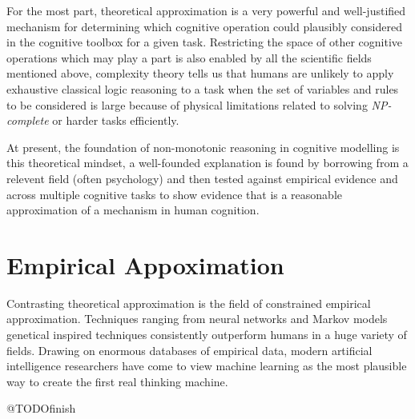 For the most part, theoretical approximation is a very powerful and well-justified mechanism for determining which cognitive operation could plausibly considered in the cognitive toolbox for a given task. Restricting the space of other cognitive operations which may play a part is also enabled by all the scientific fields mentioned above, complexity theory tells us that humans are unlikely to apply exhaustive classical logic reasoning to a task when the set of variables and rules to be considered is large because of physical limitations related to solving \textit{NP-complete} or harder tasks efficiently.

At present, the foundation of non-monotonic reasoning in cognitive modelling is this theoretical mindset, a well-founded explanation is found by borrowing from a relevent field (often psychology) and then tested against empirical evidence and across multiple cognitive tasks to show evidence that is a reasonable approximation of a mechanism in human cognition.


\section{Empirical Appoximation}
Contrasting theoretical approximation is the field of constrained empirical approximation. Techniques ranging from neural networks and Markov models genetical inspired techniques consistently outperform humans in a huge variety of fields. Drawing on enormous databases of empirical data, modern artificial intelligence researchers have come to view machine learning as the most plausible way to create the first real thinking machine.

@TODOfinish
